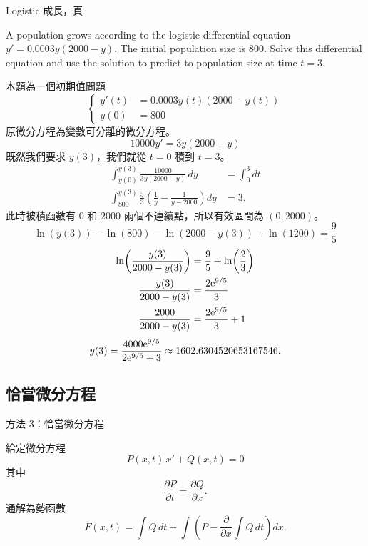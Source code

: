 \documentclass{beamer}
\newcommand{\Left} {\mathopen{}\mathclose\bgroup\left}
\newcommand{\Right}{\aftergroup\egroup\right}
\newcommand  {\e}{\textup e}
\theoremstyle{remark}
\begin{document}
\begin{CJK}{UTF8}{bsmi}
\begin{frame}[allowframebreaks]{Logistic 成長，頁}
  \begin{example}
    A population grows according to the logistic differential equation $y' = 0.0003y \left( 2000-y \right)$. The initial
    population size is 800. Solve this differential equation and use the solution to predict to population size at time
    $t=3$.
  \end{example}
  本題為一個初期值問題
  \[\left\{ \begin{aligned}
      y'(t) &= 0.0003y(t) \left( 2000-y(t) \right)\\
      y(0)  &= 800
    \end{aligned} \right.\]
  原微分方程為變數可分離的微分方程。
  \[10000y' = 3y \left( 2000 - y \right)\]
  既然我們要求 $y(3)$，我們就從 $t=0$ 積到 $t=3$。
  \begin{align*}
    \int_{y(0)}^{y(3)} \frac{10000}{3y \left( 2000 - y \right)}\,dy &= \int_0^3 dt\\
    \int_{800}^{y(3)} \frac53 \left( \frac1y - \frac{1}{y-2000} \right) dy &= 3.
  \end{align*}
  此時被積函數有 0 和 2000 兩個不連續點，所以有效區間為 $(0, 2000)$。
  \[\ln(y(3)) - \ln(800) - \ln(2000 - y(3)) + \ln(1200) = \frac95\]
  \begin{align*}
    \ln \Left( \frac{y(3)}{2000-y(3)} \Right) &= \frac95 + \ln \Left( \frac23 \Right)\\
    \frac{y(3)}{2000-y(3)} &= \frac{2\e^{9/5}}{3}\\
    \frac{2000}{2000-y(3)} &= \frac{2\e^{9/5}}{3} + 1
  \end{align*}
  \[y(3) = \frac{4000\e^{9/5}}{2\e^{9/5}+3} \approx 1602.6304520653167546.\]
\end{frame}

\subsection[恰當--積分乘數]{恰當微分方程}
\begin{frame}{方法 3：恰當微分方程}
  \begin{theorem}
    給定微分方程
    \[P(x,t)\,x' + Q(x,t) = 0\]
    其中
    \begin{equation*}
      \frac{\partial P}{\partial t} = \frac{\partial Q}{\partial x}.
    \end{equation*}
    通解為勢函數
    \[F(x,t) = \int Q\,dt + \int \left( P - \frac{\partial}{\partial x} \int Q\,dt \right) dx.\]
  \end{theorem}
\end{frame}


\end{CJK}
\end{document}
